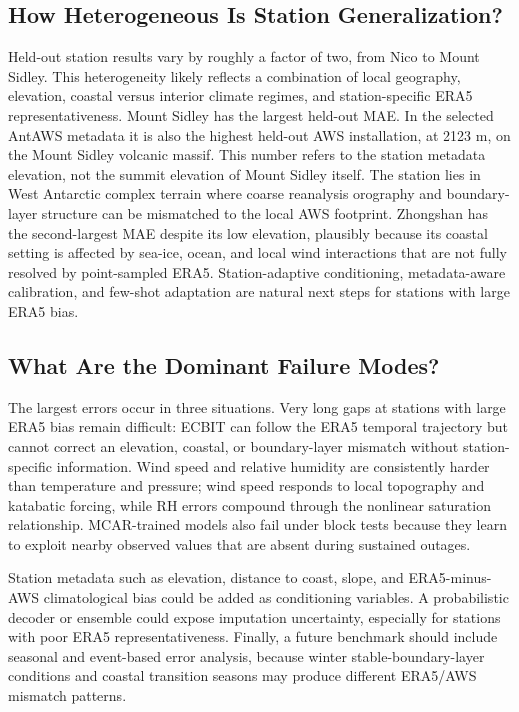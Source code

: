 \subsection{How Heterogeneous Is Station Generalization?}
Held-out station results vary by roughly a factor of two, from Nico to Mount Sidley. This heterogeneity likely reflects a combination of local geography, elevation, coastal versus interior climate regimes, and station-specific ERA5 representativeness. Mount Sidley has the largest held-out MAE. In the selected AntAWS metadata it is also the highest held-out AWS installation, at 2123 m, on the Mount Sidley volcanic massif. This number refers to the station metadata elevation, not the summit elevation of Mount Sidley itself. The station lies in West Antarctic complex terrain where coarse reanalysis orography and boundary-layer structure can be mismatched to the local AWS footprint. Zhongshan has the second-largest MAE despite its low elevation, plausibly because its coastal setting is affected by sea-ice, ocean, and local wind interactions that are not fully resolved by point-sampled ERA5. Station-adaptive conditioning, metadata-aware calibration, and few-shot adaptation are natural next steps for stations with large ERA5 bias.

\subsection{What Are the Dominant Failure Modes?}
The largest errors occur in three situations. Very long gaps at stations with large ERA5 bias remain difficult: ECBIT can follow the ERA5 temporal trajectory but cannot correct an elevation, coastal, or boundary-layer mismatch without station-specific information. Wind speed and relative humidity are consistently harder than temperature and pressure; wind speed responds to local topography and katabatic forcing, while RH errors compound through the nonlinear saturation relationship. MCAR-trained models also fail under block tests because they learn to exploit nearby observed values that are absent during sustained outages.

Station metadata such as elevation, distance to coast, slope, and ERA5-minus-AWS climatological bias could be added as conditioning variables. A probabilistic decoder or ensemble could expose imputation uncertainty, especially for stations with poor ERA5 representativeness. Finally, a future benchmark should include seasonal and event-based error analysis, because winter stable-boundary-layer conditions and coastal transition seasons may produce different ERA5/AWS mismatch patterns.

